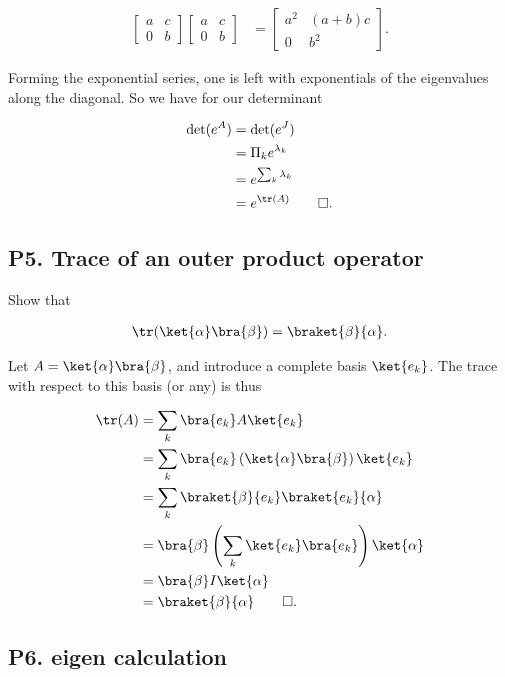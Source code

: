 \begin{align*}
\begin{bmatrix}
a & c \\
0 & b
\end{bmatrix}
\begin{bmatrix}
a & c \\
0 & b
\end{bmatrix}
&=
\begin{bmatrix}
a^2 & (a + b)c \\
0 & b^2
\end{bmatrix}.
\end{align*}

Forming the exponential series, one is left with exponentials of the eigenvalues along the diagonal.  So we have for our determinant

\begin{align*}
\det(e^A) 
&=
\det(e^J) \\
&=
\Pi_k e^{\lambda_k} \\
&=
e^{\sum_k \lambda_k} \\
&=
e^{\tr(A)} \qquad \square.
\end{align*}

\subsection{P5. Trace of an outer product operator}

Show that 

\begin{align*}
\tr( \ket{\alpha}\bra{\beta} ) = \braket{\beta}{\alpha}.
\end{align*}

Let $A = \ket{\alpha}\bra{\beta}$, and introduce a complete basis $\ket{e_k}$.  The trace with respect to this basis (or any) is thus

\begin{align*}
\tr(A) 
&= \sum_k \bra{e_k} A \ket{e_k} \\
&= \sum_k \bra{e_k} \left( \ket{\alpha} \bra{\beta} \right) \ket{e_k} \\
&= \sum_k \braket{\beta} {e_k} \braket{e_k} {\alpha} \\
&= \bra{\beta} \left( \sum_k \ket{e_k} \bra{e_k} \right) \ket{\alpha} \\
&= \bra{\beta} I \ket{\alpha} \\
&= \braket{\beta} {\alpha} \qquad \square.
\end{align*}

\subsection{P6. eigen calculation}


